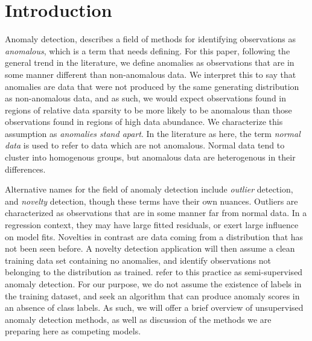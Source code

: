\section{Introduction}

Anomaly detection, describes a field of methods for identifying observations as 
    \emph{anomalous}, which is a term that needs defining. For this paper, following 
    the general trend in the literature, we define anomalies as observations that 
    are in some manner different than non-anomalous data. We interpret 
    this to say that anomalies are data that were not produced by the same 
    generating distribution as non-anomalous data, and as such, we would expect 
    observations found in regions of relative data sparsity to be more likely to 
    be anomalous than those observations found in regions of high data 
    abundance.  We characterize this assumption as \emph{anomalies stand apart}.
    In the literature as here, the term \emph{normal data} is used to refer to data 
    which are not anomalous.  Normal data tend to cluster into homogenous groups, 
    but anomalous data are heterogenous in their differences. 
    
Alternative names for the field of anomaly detection include \emph{outlier} detection, and 
    \emph{novelty} detection, though these terms have their own nuances.
    Outliers are characterized as observations that are in some manner 
    far from normal data.  In a regression context, they may have
    large fitted residuals, or exert large influence on model fits.  Novelties
    in contrast are data coming from a distribution that has not been seen
    before.  A novelty detection application will then assume a clean 
    training data set containing no anomalies, and identify observations not
    belonging to the distribution as trained.  \cite{Chandola2009} refer to 
    this practice as semi-supervised anomaly detection. For our purpose, we do 
    not assume the existence of labels in the training 
    dataset, and seek an algorithm that can produce anomaly scores in an absence 
    of class labels. As such, we will offer a brief overview of unsupervised 
    anomaly detection methods, as well as discussion of the methods we are 
    preparing here as competing models.
    
